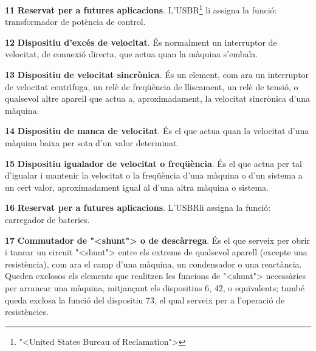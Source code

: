 \begin{multicols}{2}
\begin{list}{}
\item[\textbf{11}] \textbf{Reservat per a  futures aplicacions}.
L'\textsf{USBR}\footnote{{"<}United States Bureau of Reclamation{">}}
 li assigna la funci\'{o}: transformador de pot\`{e}ncia de control.

\item[\textbf{12}]  \textbf{Dispositiu d'exc\'{e}s de velocitat}. \'{E}s normalment un
interruptor de velocitat, de connexi\'{o} directa, que
actua quan la m\`{a}quina  s'embala.

\item[\textbf{13}]  \textbf{Dispositiu de
velocitat sincr\`{o}nica}. \'{E}s un element, com ara un interruptor de
velocitat centr\'{\i}fuga, un rel\`{e} de freq\"{u}\`{e}ncia de lliscament, un rel\`{e}
de tensi\'{o}, o qualsevol altre aparell que actua a, aproximadament, la
velocitat sincr\`{o}nica d'una m\`{a}quina.

\item[\textbf{14}]  \textbf{Dispositiu de manca de velocitat}. \'{E}s el que actua quan la velocitat d'una m\`{a}quina baixa per sota d'un valor determinat.

\item[\textbf{15}] 
\textbf{Dispositiu igualador de velocitat o freq\"{u}\`{e}ncia}. \'{E}s el que
actua per tal d'igualar i mantenir la velocitat o la  freq\"{u}\`{e}ncia
d'una m\`{a}quina o d'un sistema a un cert valor, aproximadament igual
al  d'una altra m\`{a}quina o sistema.

\item[\textbf{16}] \textbf{Reservat per a  futures aplicacions}.
L'\textsf{USBR}\footnotemark[1] li assigna la funci\'{o}: carregador de
bateries.

\item[\textbf{17}]  \textbf{Commutador
de  {"<}shunt{">} o de desc\`{a}rrega}. \'{E}s el que serveix per obrir i tancar
un circuit {"<}shunt{">} entre els extrems de qualsevol aparell (excepte
una resist\`{e}ncia), com ara el camp d'una m\`{a}quina, un condensador o
una react\`{a}ncia. Queden exclosos els elements que realitzen les
funcions de {"<}shunt{">} necess\`{a}ries per arrancar una m\`{a}quina, mitjan\c{c}ant
els dispositius 6, 42, o equivalents; tamb\'{e} queda exclosa la funci\'{o}
del dispositiu 73, el qual serveix per a l'operaci\'{o} de resist\`{e}ncies.


\end{list}
\end{multicols}
